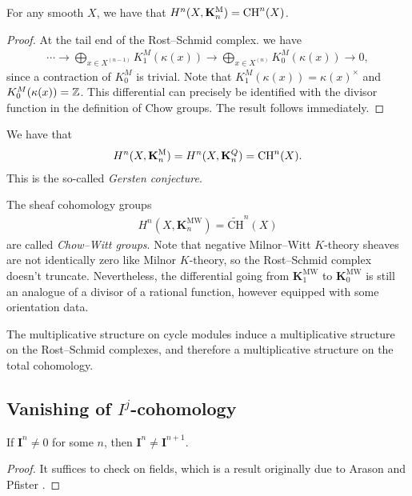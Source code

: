 \documentclass[11pt,openany]{book}
\providecommand{\KM}{\mathbf{K}^\mathrm{M}}
\providecommand{\KMW}{\mathbf{K}^\mathrm{MW}}
\providecommand{\CHW}{\widetilde{\mathrm{CH}}}
\begin{document}
\begin{theorem} For any smooth $X$, we have that $H^n(X,\KM_n) = \CH^n(X)$.
\end{theorem}
\begin{proof} At the tail end of the Rost--Schmid complex. we have
\begin{align*}
    \cdots \to \bigoplus_{x\in X^{(n-1)}} K_1^M (\kappa(x)) \to \bigoplus_{x\in X^{(n)}} K_0^M(\kappa(x)) \to 0,
\end{align*}
since a contraction of $K_0^M$ is trivial. Note that $K_1^M(\kappa(x)) = \kappa(x)^\times$ and $K_0^M(\kappa(x)) = \mathbb{Z}$. This differential can precisely be identified with the divisor function in the definition of Chow groups. The result follows immediately.
\end{proof}

\begin{corollary}\label{cor:gersten_conj} We have that
\begin{align*}
    H^n(X,\KM_n) = H^n(X, \mathbf{K}^Q_n) = \CH^n(X).
\end{align*}
This is the so-called \textit{Gersten conjecture}.
\end{corollary}


\begin{definition} The sheaf cohomology groups
\begin{align*}
    H^n(X, \KMW_n) = \CHW^n(X)
\end{align*}
are called \textit{Chow--Witt groups}. Note that negative Milnor--Witt $K$-theory sheaves are not identically zero like Milnor $K$-theory, so the Rost--Schmid complex doesn't truncate. Nevertheless, the differential going from $\KMW_1$ to $\KMW_0$ is still an analogue of a divisor of a rational function, however equipped with some orientation data.
\end{definition}

\begin{remark} The multiplicative structure on cycle modules induce a multiplicative structure on the Rost--Schmid complexes, and therefore a multiplicative structure on the total cohomology.
\end{remark}




\subsection{Vanishing of $I^j$-cohomology}

\begin{proposition} If $\mathbf{I}^n \ne 0$ for some $n$, then $\mathbf{I}^n \ne \mathbf{I}^{n+1}$.
\end{proposition}
\begin{proof} It suffices to check on fields, which is a result originally due to Arason and Pfister \cite[Korollar~2]{ArasonPfister}.
\end{proof}
\end{document}
